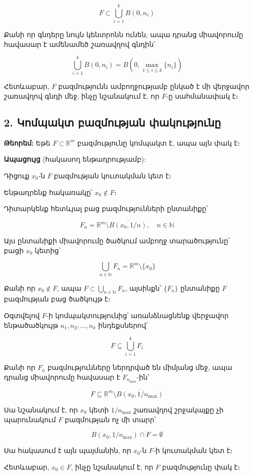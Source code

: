 \documentclass[12pt, a4paper]{article}
\begin{document}
$$F \subset \bigcup_{i=1}^{k} B(0, n_i)$$

Քանի որ գնդերը նույն կենտրոնն ունեն, ապա դրանց միավորումը հավասար է ամենամեծ շառավղով գնդին՝

$$\bigcup_{i=1}^{k} B(0, n_i) = B(0, \max_{1 \le i \le k} \{n_i\})$$

Հետևաբար, $F$ բազմությունն ամբողջությամբ ընկած է մի վերջավոր շառավղով գնդի մեջ, ինչը նշանակում է, որ $F$-ը սահմանափակ է։

\subsection{2. Կոմպակտ բազմության փակությունը}

\textbf{Թեորեմ:} Եթե $F \subset \mathbb{R}^m$ բազմությունը կոմպակտ է, ապա այն փակ է։

\textbf{Ապացույց} (հակասող ենթադրությամբ):

Դիցուք $x_0$-ն $F$ բազմության կուտակման կետ է։

Ենթադրենք հակառակը՝ $x_0 \notin F$։

Դիտարկենք հետևյալ բաց բազմությունների ընտանիքը՝

$$F_n = \mathbb{R}^m \setminus \overline{B(x_0, 1/n)}, \quad n \in \mathbb{N}$$

Այս ընտանիքի միավորումը ծածկում ամբողջ տարածությունը՝ բացի $x_0$ կետից՝

$$\bigcup_{n \in \mathbb{N}} F_n = \mathbb{R}^m \setminus \{x_0\}$$

Քանի որ $x_0 \notin F$, ապա $F \subset \bigcup_{n \in \mathbb{N}} F_n$, այսինքն՝ $\{F_n\}$ ընտանիքը $F$ բազմության բաց ծածկույթ է։

Օգտվելով $F$-ի կոմպակտությունից՝ առանձնացնենք վերջավոր ենթածածկույթ $n_1, n_2, \dots, n_k$ ինդեքսներով՝

$$F \subseteq \bigcup_{i=1}^{k} F_i$$

Քանի որ $F_n$ բազմությունները ներդրված են միմյանց մեջ, ապա դրանց միավորումը հավասար է $F_{n_{\max}}$-ին՝

$$F \subseteq \mathbb{R}^m \setminus \overline{B(x_0, 1/n_{\max})}$$

Սա նշանակում է, որ $x_0$ կետի $1/n_{\max}$ շառավղով շրջակայքը չի պարունակում $F$ բազմության ոչ մի տարր՝

$$B(x_0, 1/n_{\max}) \cap F = \emptyset$$

Սա հակասում է այն պայմանին, որ $x_0$-ն $F$-ի կուտակման կետ է։

Հետևաբար, $x_0 \in F$, ինչը նշանակում է, որ $F$ բազմությունը փակ է։
\end{document}
